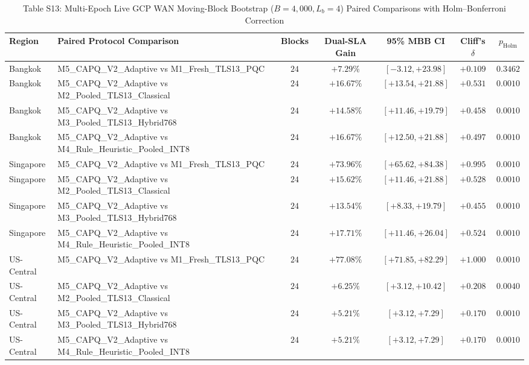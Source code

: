 \documentclass[10pt,journal,compsoc]{IEEEtran}
\begin{document}
\begin{table}[!t]
\centering
\caption{Table S13: Multi-Epoch Live GCP WAN Moving-Block Bootstrap ($B=4{,}000, L_b=4$) Paired Comparisons with Holm--Bonferroni Correction}
\setlength{\tabcolsep}{4.0pt}
\renewcommand{\arraystretch}{1.04}
\begin{adjustbox}{max width=\textwidth}
\begin{tabular}{@{}llccccc@{}}
\toprule
\textbf{Region} & \textbf{Paired Protocol Comparison} & \textbf{Blocks} & \textbf{Dual-SLA Gain} & \textbf{95\% MBB CI} & \textbf{Cliff's $\delta$} & \textbf{$p_{\mathrm{Holm}}$} \\
\midrule
Bangkok & M5\_CAPQ\_V2\_Adaptive vs M1\_Fresh\_TLS13\_PQC & $24$ & $+7.29\%$ & $[-3.12, +23.98]$ & $+0.109$ & $0.3462$ \\
Bangkok & M5\_CAPQ\_V2\_Adaptive vs M2\_Pooled\_TLS13\_Classical & $24$ & $+16.67\%$ & $[+13.54, +21.88]$ & $+0.531$ & $0.0010$ \\
Bangkok & M5\_CAPQ\_V2\_Adaptive vs M3\_Pooled\_TLS13\_Hybrid768 & $24$ & $+14.58\%$ & $[+11.46, +19.79]$ & $+0.458$ & $0.0010$ \\
Bangkok & M5\_CAPQ\_V2\_Adaptive vs M4\_Rule\_Heuristic\_Pooled\_INT8 & $24$ & $+16.67\%$ & $[+12.50, +21.88]$ & $+0.497$ & $0.0010$ \\
Singapore & M5\_CAPQ\_V2\_Adaptive vs M1\_Fresh\_TLS13\_PQC & $24$ & $+73.96\%$ & $[+65.62, +84.38]$ & $+0.995$ & $0.0010$ \\
Singapore & M5\_CAPQ\_V2\_Adaptive vs M2\_Pooled\_TLS13\_Classical & $24$ & $+15.62\%$ & $[+11.46, +21.88]$ & $+0.528$ & $0.0010$ \\
Singapore & M5\_CAPQ\_V2\_Adaptive vs M3\_Pooled\_TLS13\_Hybrid768 & $24$ & $+13.54\%$ & $[+8.33, +19.79]$ & $+0.455$ & $0.0010$ \\
Singapore & M5\_CAPQ\_V2\_Adaptive vs M4\_Rule\_Heuristic\_Pooled\_INT8 & $24$ & $+17.71\%$ & $[+11.46, +26.04]$ & $+0.524$ & $0.0010$ \\
US-Central & M5\_CAPQ\_V2\_Adaptive vs M1\_Fresh\_TLS13\_PQC & $24$ & $+77.08\%$ & $[+71.85, +82.29]$ & $+1.000$ & $0.0010$ \\
US-Central & M5\_CAPQ\_V2\_Adaptive vs M2\_Pooled\_TLS13\_Classical & $24$ & $+6.25\%$ & $[+3.12, +10.42]$ & $+0.208$ & $0.0040$ \\
US-Central & M5\_CAPQ\_V2\_Adaptive vs M3\_Pooled\_TLS13\_Hybrid768 & $24$ & $+5.21\%$ & $[+3.12, +7.29]$ & $+0.170$ & $0.0010$ \\
US-Central & M5\_CAPQ\_V2\_Adaptive vs M4\_Rule\_Heuristic\_Pooled\_INT8 & $24$ & $+5.21\%$ & $[+3.12, +7.29]$ & $+0.170$ & $0.0010$ \\
\bottomrule
\end{tabular}
\end{adjustbox}
\end{table}



\end{document}
